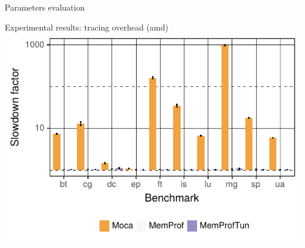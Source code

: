 \documentclass[xcolor={usenames,dvipsnames},hyperref={pdfusetitle}]{beamer}
\begin{document}
\setcounter{framenumber}{\value{finalframe}}
\begin{frame}{Parameters evaluation}
    \pause
\end{frame}


\setcounter{framenumber}{\value{finalframe}}
\begin{frame}{Experimental results: tracing overhead (amd)}
        \includegraphics[width=\linewidth]{moca/slides/moca_overhead_amd.pdf}
\end{frame}
\end{document}

